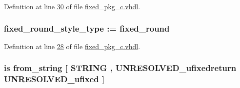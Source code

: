 Definition at line \hyperlink{fixed__pkg__c_8vhdl_source_l00030}{30} of file \hyperlink{fixed__pkg__c_8vhdl_source}{fixed\+\_\+pkg\+\_\+c.\+vhdl}.

\hypertarget{classfixed__pkg_aba8efbe8f71b626e5891bb42e09b43b0}{}
\subsubsection[{fixed\+\_\+round\+\_\+style}]{ {\bfseries {\bfseries {\bf fixed\+\_\+round\+\_\+style\+\_\+type}} \textcolor{vhdlchar}{ }\textcolor{vhdlchar}{ }\textcolor{vhdlchar}{\+:}\textcolor{vhdlchar}{=}\textcolor{vhdlchar}{ }\textcolor{vhdlchar}{ }\textcolor{vhdlchar}{ }\textcolor{vhdlchar}{ }\textcolor{vhdlchar}{fixed\+\_\+round}\textcolor{vhdlchar}{ }} \hspace{0.3cm}{\ttfamily [Constant]}}\label{classfixed__pkg_aba8efbe8f71b626e5891bb42e09b43b0}


Definition at line \hyperlink{fixed__pkg__c_8vhdl_source_l00028}{28} of file \hyperlink{fixed__pkg__c_8vhdl_source}{fixed\+\_\+pkg\+\_\+c.\+vhdl}.

\hypertarget{classfixed__pkg_aafa4d3f9d3a16fe18448d65ee36e70c7}{}
\subsubsection[{from\+\_\+binary\+\_\+string}]{ {\bfseries \textcolor{keywordflow}{is}\textcolor{vhdlchar}{ }\textcolor{vhdlchar}{from\+\_\+string}\textcolor{vhdlchar}{ }\textcolor{vhdlchar}{\mbox{[}}\textcolor{vhdlchar}{ }\textcolor{comment}{S\+T\+R\+I\+N\+G}\textcolor{vhdlchar}{ }\textcolor{vhdlchar}{,}\textcolor{vhdlchar}{ }\textcolor{vhdlchar}{U\+N\+R\+E\+S\+O\+L\+V\+E\+D\+\_\+ufixedreturn}\textcolor{vhdlchar}{ }{\bfseries {\bf U\+N\+R\+E\+S\+O\+L\+V\+E\+D\+\_\+ufixed}} \textcolor{vhdlchar}{ }\textcolor{vhdlchar}{\mbox{]}}\textcolor{vhdlchar}{ }} \hspace{0.3cm}{\ttfamily [Alias]}}\label{classfixed__pkg_aafa4d3f9d3a16fe18448d65ee36e70c7}


